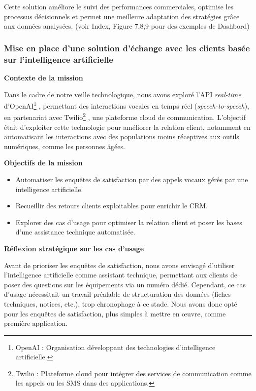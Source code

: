 Cette solution améliore le suivi des performances commerciales, optimise les processus décisionnels et permet une meilleure adaptation des stratégies grâce aux données analysées. (voir Index, Figure 7,8,9 pour des exemples de Dashbord)

\subsubsection{Mise en place d’une solution d’échange avec les clients basée sur l’intelligence artificielle}

\textbf{Contexte de la mission}\vspace{0.3cm}

Dans le cadre de notre veille technologique, nous avons exploré l’API \textit{real-time} d’OpenAI\footnote{OpenAI : Organisation développant des technologies d’intelligence artificielle.}
, permettant des interactions vocales en temps réel (\textit{speech-to-speech}), en partenariat avec Twilio\footnote{Twilio : Plateforme cloud pour intégrer des services de communication comme les appels ou les SMS dans des applications.}
, une plateforme cloud de communication. L’objectif était d’exploiter cette technologie pour améliorer la relation client, notamment en automatisant les interactions avec des populations moins réceptives aux outils numériques, comme les personnes âgées.\vspace{0.3cm}

\textbf{Objectifs de la mission}\vspace{0.3cm}

\begin{itemize}
    \item Automatiser les enquêtes de satisfaction par des appels vocaux gérés par une intelligence artificielle.\vspace{0.3cm}
    \item Recueillir des retours clients exploitables pour enrichir le CRM.\vspace{0.3cm}
    \item Explorer des cas d’usage pour optimiser la relation client et poser les bases d’une assistance technique automatisée.\vspace{0.3cm}
\end{itemize}

\textbf{Réflexion stratégique sur les cas d’usage}\vspace{0.3cm}

Avant de prioriser les enquêtes de satisfaction, nous avons envisagé d’utiliser l’intelligence artificielle comme assistant technique, permettant aux clients de poser des questions sur les équipements via un numéro dédié. Cependant, ce cas d’usage nécessitait un travail préalable de structuration des données (fiches techniques, notices, etc.), trop chronophage à ce stade. Nous avons donc opté pour les enquêtes de satisfaction, plus simples à mettre en œuvre, comme première application.\vspace{0.3cm}

